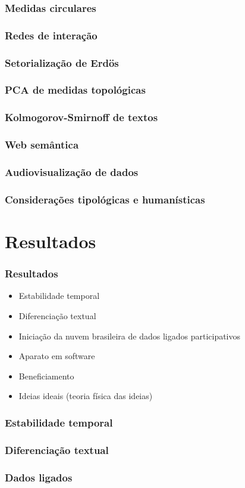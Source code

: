 \documentclass[10pt]{beamer}
\begin{document}
\begin{frame}
\frametitle{Medidas circulares}
\end{frame}
\begin{frame}
\frametitle{Redes de interação}
\end{frame}
\begin{frame}
\frametitle{Setorialização de Erdös}
\end{frame}
\begin{frame}
\frametitle{PCA de medidas topológicas}
\end{frame}
\begin{frame}
\frametitle{Kolmogorov-Smirnoff de textos}
\end{frame}
\begin{frame}
\frametitle{Web semântica}
\end{frame}
\begin{frame}
\frametitle{Audiovisualização de dados}
\end{frame}
\begin{frame}
\frametitle{Considerações tipológicas e humanísticas}
\end{frame}

\section{Resultados}
\begin{frame}
\frametitle{Resultados}
\begin{itemize}
	\item Estabilidade temporal
	\item Diferenciação textual
	\item Iniciação da nuvem brasileira de dados ligados participativos
	\item Aparato em software
	\item Beneficiamento
	\item Ideias ideais (teoria física das ideias)
\end{itemize}
\end{frame}

\begin{frame}
\frametitle{Estabilidade temporal}
\end{frame}

\begin{frame}
\frametitle{Diferenciação textual}
\end{frame}

\begin{frame}
\frametitle{Dados ligados}
\end{frame}
\end{document}

